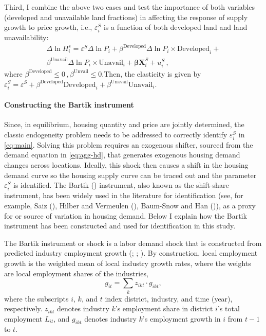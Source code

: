 \documentclass[
  12pt,
]{article}
\begin{document}
Third, I combine the above two cases and test the importance of both variables (developed and unavailable land fractions) in affecting the response of supply growth to price growth, i.e., \(\varepsilon^S_i\) is a function of both developed land and land unavailability: \begin{equation}
\begin{split}
\Delta\ln H_i^s = \varepsilon^S\Delta\ln P_i + \beta^{\text{Developed}} \Delta \ln P_i\times\text{Developed}_i + \\
\beta^{\text{Unavail}} \Delta \ln P_i\times\text{Unavail}_i + \boldsymbol{\beta}\boldsymbol{X}_i^S + u^S_i\,, \label{eq:case-4}
\end{split}
\end{equation} where \(\beta^{\text{Developed}} \le 0\,, \beta^{\text{Unvail}}\le0\).Then, the elasticity is given by \(\varepsilon^S_i = \varepsilon^S + \beta^{\text{Developed}}\text{Developed}_i + \beta^{\text{Unavail}}\text{Unavail}_i\).

\paragraph{Constructing the Bartik instrument}\label{constructing-the-bartik-instrument}

Since, in equilibrium, housing quantity and price are jointly determined, the classic endogeneity problem needs to be addressed to correctly identify \(\varepsilon^S_i\) in \eqref{eq:main}. Solving this problem requires an exogenous shifter, sourced from the demand equation in \eqref{eq:agg-hd}, that generates exogenous housing demand changes across locations. Ideally, this shock then causes a shift in the housing demand curve so the housing supply curve can be traced out and the parameter \(\varepsilon^S_i\) is identified. The Bartik () instrument, also known as the shift-share instrument, has been widely used in the literature for identification (see, for example, Saiz (), Hilber and Vermeulen (), Baum-Snow and Han ()), as a proxy for or source of variation in housing demand. Below I explain how the Bartik instrument has been constructed and used for identification in this study.

The Bartik instrument or shock is a labor demand shock that is constructed from predicted industry employment growth (; ; ). By construction, local employment growth is the weighted mean of local industry growth rates, where the weights are local employment shares of the industries, \begin{equation}
 g_{it} = \sum_k z_{ikt}\cdot g_{ikt},
\end{equation}where the subscripts \(i\), \(k\), and \(t\) index district, industry, and time (year), respectively. \(z_{ikt}\) denotes industry \(k\)'s employment share in district \(i\)'s total employment \(L_{it}\), and \(g_{ikt}\) denotes industry \(k\)'s employment growth in \(i\) from \(t-1\) to \(t\).
\end{document}
